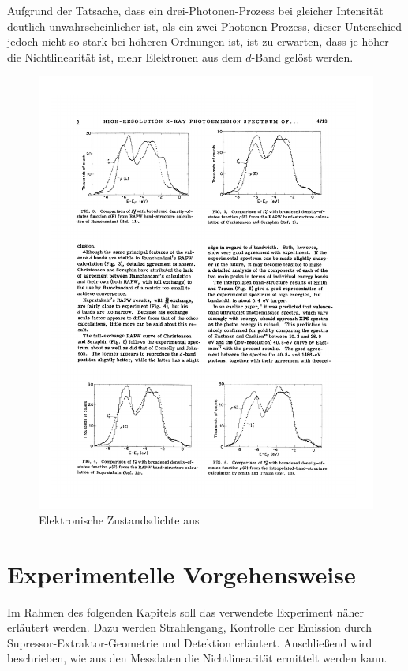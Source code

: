 \documentclass[bachelor,       %
               twoside,        %
               BCOR10mm,       %
               english,ngerman, %
               final,          %
               ]{GAUBM}
\begin{document}
Aufgrund der Tatsache, dass ein drei-Photonen-Prozess bei gleicher Intensität deutlich unwahrscheinlicher ist, als ein zwei-Photonen-Prozess, dieser Unterschied jedoch nicht so stark bei höheren Ordnungen ist, ist zu erwarten, dass je höher die Nichtlinearität ist, mehr Elektronen aus dem $d$-Band gelöst werden.

\begin{figure}[h!]
	\centering
	\includegraphics{GoldZustandsdichte}
	\caption{Elektronische Zustandsdichte aus \cite{gold_zustandsdichte}}
	\label{fig:gold_zustandsdichte}
\end{figure}


\chapter{Experimentelle Vorgehensweise}
Im Rahmen des folgenden Kapitels soll das verwendete Experiment näher erläutert werden.
Dazu werden Strahlengang, Kontrolle der Emission durch Supressor-Extraktor-Geometrie und Detektion erläutert.
Anschließend wird beschrieben, wie aus den Messdaten die Nichtlinearität ermittelt werden kann.\\
\end{document}
